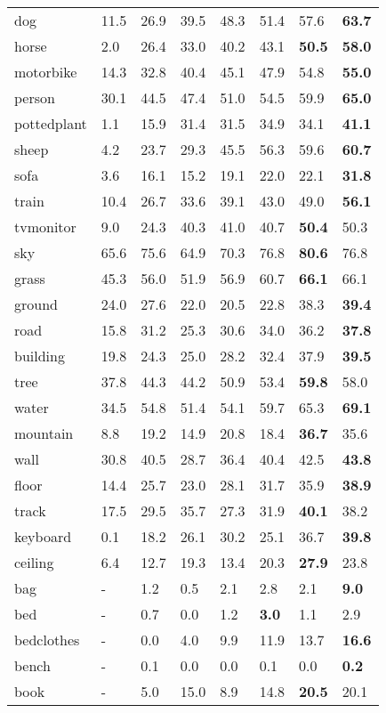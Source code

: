 \documentclass[10pt,twocolumn,letterpaper]{article}
\begin{document}
\begin{table}
\begin{center}
{\begin{tabular}{|x|xx|xxx|x|x|}
	dog\dag&11.5&26.9&39.5&48.3&{51.4}&57.6&\textbf{63.7}\\
	horse\dag&2.0&26.4&33.0&40.2&{43.1}&{\textbf{50.5}}&\textbf{58.0}\\
	motorbike\dag&14.3&32.8&40.4&45.1&{47.9}&54.8&\textbf{55.0}\\
	person\dag&30.1&44.5&47.4&51.0&{54.5}&59.9&\textbf{65.0}\\
	pottedplant\dag&1.1&15.9&31.4&31.5&34.9&{34.1}&\textbf{41.1}\\
	sheep\dag&4.2&23.7&29.3&45.5&{56.3}&59.6&\textbf{60.7}\\
	sofa\dag&3.6&16.1&15.2&19.1&{22.0}&22.1&\textbf{31.8}\\
	train\dag&10.4&26.7&33.6&39.1&{43.0}&{49.0}&\textbf{56.1}\\
	tvmonitor\dag&9.0&24.3&40.3&{41.0}&40.7&{\textbf{50.4}}&50.3\\
	sky\dag&65.6&75.6&64.9&70.3&{76.8}&{\textbf{80.6}}&76.8\\
	grass\dag&45.3&56.0&51.9&56.9&{60.7}&{\textbf{66.1}}&66.1\\
	ground\dag&24.0&{27.6}&22.0&20.5&22.8&38.3&\textbf{39.4}\\
	road\dag&15.8&31.2&25.3&30.6&{34.0}&{36.2}&\textbf{37.8}\\
	building\dag&19.8&24.3&25.0&28.2&{32.4}&37.9&\textbf{39.5}\\
	tree\dag&37.8&44.3&44.2&50.9&{53.4}&{\textbf{59.8}}&58.0\\
	water\dag&34.5&54.8&51.4&54.1&{59.7}&65.3&\textbf{69.1}\\
	mountain\dag&8.8&19.2&14.9&{20.8}&18.4&{\textbf{36.7}}&35.6\\
	wall\dag&30.8&{40.5}&28.7&36.4&40.4&{42.5}&\textbf{43.8}\\
	floor\dag&14.4&25.7&23.0&28.1&{31.7}&{35.9}&\textbf{38.9}\\
	track\dag&17.5&29.5&{35.7}&27.3&31.9&{\textbf{40.1}}&38.2\\
	keyboard\dag&0.1&18.2&26.1&{30.2}&25.1&{36.7}&\textbf{39.8}\\
	ceiling\dag&6.4&12.7&19.3&13.4&{20.3}&\textbf{27.9}&23.8\\
	bag&-&1.2&0.5&2.1&2.8&{2.1}&\textbf{9.0}\\
	bed&-&0.7&0.0&1.2&\textbf{3.0}&{1.1}&2.9\\
	bedclothes&-&0.0&4.0&9.9&{11.9}&13.7&\textbf{16.6}\\
	bench&-&0.1&0.0&0.0&0.1&{0.0}&\textbf{0.2}\\
	book&-&5.0&{15.0}&8.9&14.8&{\textbf{20.5}}&20.1\\

\end{tabular}}
\end{center}
\end{table}
\end{document}
